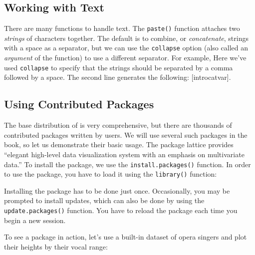 \subsection{Working with Text}
There are many functions to handle text. The \lstinline{paste()} function attaches two 
\emph{strings} of characters together. The default is to combine, or \emph{concatenate},
 strings with a space as a separator, but we can use the \lstinline{collapse} option 
 (also called an \emph{argument} of the function) to use a different separator. For example,
\noindent Here we've used \lstinline{collapse} to specify that the strings should be 
separated by a comma followed by a space.  The second line generates the 
following: [introcatvar].


\subsection{Using Contributed Packages}
The base distribution of \R is very comprehensive, but there are thousands of contributed
packages written by \R users. We will use several such packages in the book, so let us
demonstrate their basic usage.
The package lattice provides ``elegant high-level data visualization system with an
emphasis on multivariate data.'' To install the package, we use the
\lstinline{install.packages()} function. In order to use the package, you have to load
it using the \lstinline{library()} function:


Installing the package has to be done just once. Occasionally, you may be prompted
to install updates, which can also be done by using the \lstinline{update.packages()}
function. You have to reload the package each time you begin a new \R session.


To see a package in action, let's use a built-in dataset of opera singers and plot their
heights by their vocal range:

